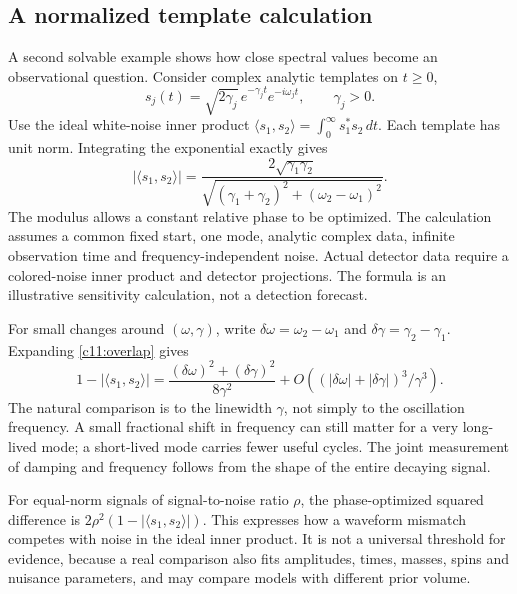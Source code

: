 \subsection{A normalized template calculation}
A second solvable example shows how close spectral values become an observational question. Consider complex analytic templates on $t\geq0$,
\begin{equation}
 s_j(t)=\sqrt{2\gamma_j}\,e^{-\gamma_jt}e^{-i\omega_jt},
 \qquad \gamma_j>0.
 \label{c11:templates}
\end{equation}
Use the ideal white-noise inner product $\langle s_1,s_2\rangle=\int_0^\infty s_1^*s_2\,dt$. Each template has unit norm. Integrating the exponential exactly gives
\begin{equation}
 |\langle s_1,s_2\rangle|
 =\frac{2\sqrt{\gamma_1\gamma_2}}
 {\sqrt{(\gamma_1+\gamma_2)^2+(\omega_2-\omega_1)^2}}.
 \label{c11:overlap}
\end{equation}
The modulus allows a constant relative phase to be optimized. The calculation assumes a common fixed start, one mode, analytic complex data, infinite observation time and frequency-independent noise. Actual detector data require a colored-noise inner product and detector projections. The formula is an illustrative sensitivity calculation, not a detection forecast.

For small changes around $(\omega,\gamma)$, write $\delta\omega=\omega_2-\omega_1$ and $\delta\gamma=\gamma_2-\gamma_1$. Expanding \eqref{c11:overlap} gives
\begin{equation}
 1-|\langle s_1,s_2\rangle|
 =\frac{(\delta\omega)^2+(\delta\gamma)^2}{8\gamma^2}
 +O\!\left((|\delta\omega|+|\delta\gamma|)^3/\gamma^3\right).
 \label{c11:mismatch}
\end{equation}
The natural comparison is to the linewidth $\gamma$, not simply to the oscillation frequency. A small fractional shift in frequency can still matter for a very long-lived mode; a short-lived mode carries fewer useful cycles. The joint measurement of damping and frequency follows from the shape of the entire decaying signal.

For equal-norm signals of signal-to-noise ratio $\rho$, the phase-optimized squared difference is $2\rho^2(1-|\langle s_1,s_2\rangle|)$. This expresses how a waveform mismatch competes with noise in the ideal inner product. It is not a universal threshold for evidence, because a real comparison also fits amplitudes, times, masses, spins and nuisance parameters, and may compare models with different prior volume.

